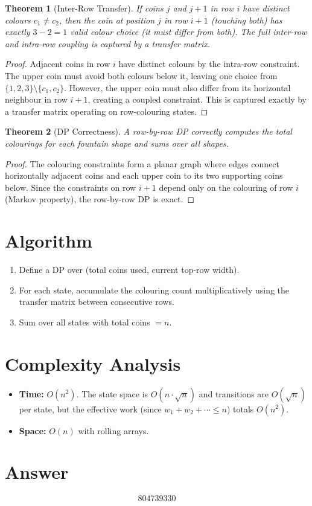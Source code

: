 \documentclass[11pt]{article}
\newtheorem{theorem}{Theorem}
\begin{document}
\begin{theorem}[Inter-Row Transfer]
If coins $j$ and $j+1$ in row $i$ have distinct colours $c_1 \neq c_2$, then the coin at position $j$ in row $i+1$ (touching both) has exactly $3 - 2 = 1$ valid colour choice (it must differ from both). The full inter-row and intra-row coupling is captured by a transfer matrix.
\end{theorem}

\begin{proof}
Adjacent coins in row $i$ have distinct colours by the intra-row constraint. The upper coin must avoid both colours below it, leaving one choice from $\{1,2,3\} \setminus \{c_1, c_2\}$. However, the upper coin must also differ from its horizontal neighbour in row $i+1$, creating a coupled constraint. This is captured exactly by a transfer matrix operating on row-colouring states.
\end{proof}

\begin{theorem}[DP Correctness]
A row-by-row DP correctly computes the total colourings for each fountain shape and sums over all shapes.
\end{theorem}

\begin{proof}
The colouring constraints form a planar graph where edges connect horizontally adjacent coins and each upper coin to its two supporting coins below. Since the constraints on row $i+1$ depend only on the colouring of row $i$ (Markov property), the row-by-row DP is exact.
\end{proof}

\section{Algorithm}

\begin{enumerate}
    \item Define a DP over (total coins used, current top-row width).
    \item For each state, accumulate the colouring count multiplicatively using the transfer matrix between consecutive rows.
    \item Sum over all states with total coins $= n$.
\end{enumerate}

\section{Complexity Analysis}

\begin{itemize}
    \item \textbf{Time:} $O(n^2)$. The state space is $O(n \cdot \sqrt{n})$ and transitions are $O(\sqrt{n})$ per state, but the effective work (since $w_1 + w_2 + \cdots \leq n$) totals $O(n^2)$.
    \item \textbf{Space:} $O(n)$ with rolling arrays.
\end{itemize}

\section{Answer}

\[
\boxed{804739330}
\]
\end{document}
